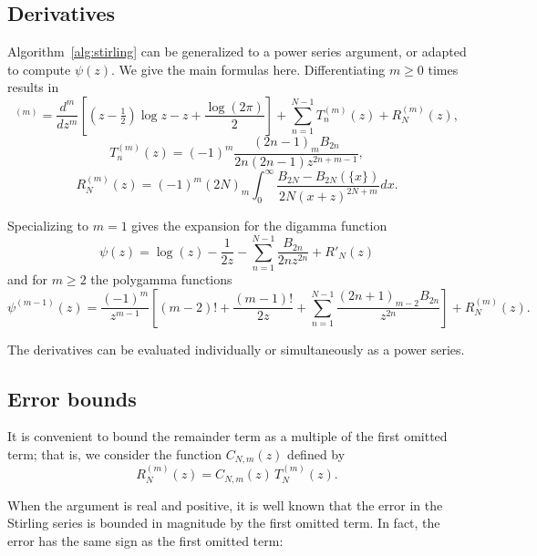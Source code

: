 \documentclass[reqno]{amsart}
\theoremstyle{definition}
\begin{document}
\subsection{Derivatives}

Algorithm~\ref{alg:stirling} can be generalized to a power series argument,
or adapted to compute $\psi(z)$.
We give the main formulas here.
Differentiating $m \ge 0$ times results in
\begin{equation}
[\log \Gamma(z)]^{(m)} = \frac{d^m}{dz^m} \left[\left(z-\tfrac{1}{2}\right)\log z - z + \frac{\log(2 \pi)}{2} \right] + \sum_{n=1}^{N-1} T^{(m)}_n(z) + R^{(m)}_N(z),
\end{equation}
\begin{equation}
T_n^{(m)}(z) = (-1)^m \frac{(2n-1)_{m} B_{2n}}{2n (2n-1) z^{2n+m-1}},
\end{equation}
\begin{equation}
R_N^{(m)}(z) = (-1)^m (2N)_{m} \int_0^{\infty} \frac{B_{2N} - B_{2N}(\{x\})}{2N(x+z)^{2N+m}} dx.
\end{equation}

Specializing to $m = 1$ gives the expansion for the digamma function
\begin{equation}
\label{eq:stirlingdigamma}
\psi(z) = \log(z) - \frac{1}{2z} - \sum_{n=1}^{N-1}  \frac{B_{2n}}{2n z^{2n}} + R'_N(z)
\end{equation}
and for $m \ge 2$ the polygamma functions
\begin{equation}
\label{eq:stirlingpolygamma}
\psi^{(m-1)}(z) = \frac{(-1)^m}{z^{m-1}} \left[ (m-2)! + \frac{(m-1)!}{2 z} + \sum_{n=1}^{N-1} \frac{(2n+1)_{m-2} B_{2n}}{z^{2n}}\right] + R^{(m)}_N(z).
\end{equation}

The derivatives can be evaluated individually or simultaneously as a power series.

\subsection{Error bounds}

\label{sect:stirlbounds}

It is convenient to bound the remainder term
as a multiple of the first omitted term; that is,
we consider the function $C_{N,m}(z)$ defined by
\begin{equation}
R_N^{(m)}(z) = C_{N,m}(z) \, T_N^{(m)}(z).
\end{equation}

When the argument is real and positive,
it is well known that the error in the Stirling series
is bounded in magnitude by the first omitted term.
In fact, the error has the same sign as the first omitted term:
\end{document}
